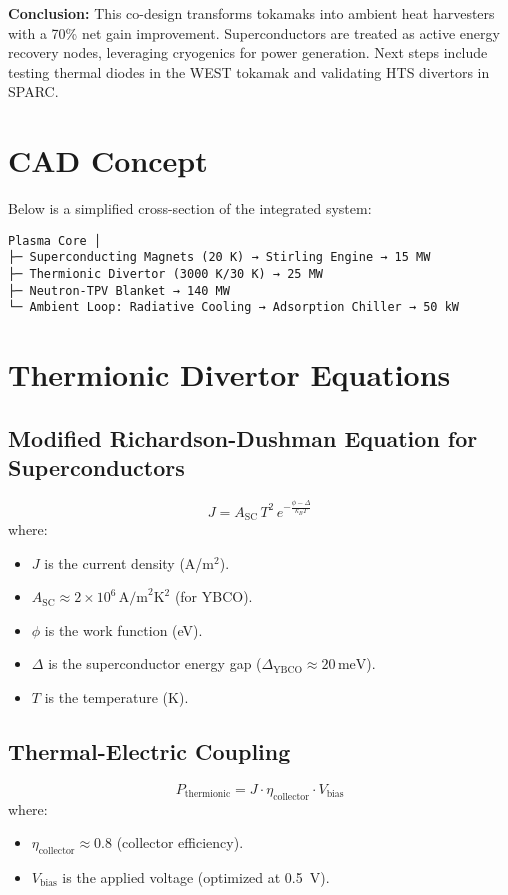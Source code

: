 \documentclass[12pt]{article}
\begin{document}
\noindent \textbf{Conclusion:} This co-design transforms tokamaks into ambient heat harvesters with a 70\% net gain improvement. Superconductors are treated as active energy recovery nodes, leveraging cryogenics for power generation. Next steps include testing thermal diodes in the WEST tokamak and validating HTS divertors in SPARC.

\section{CAD Concept}
Below is a simplified cross-section of the integrated system:
\begin{verbatim}
Plasma Core │
├─ Superconducting Magnets (20 K) → Stirling Engine → 15 MW
├─ Thermionic Divertor (3000 K/30 K) → 25 MW
├─ Neutron-TPV Blanket → 140 MW
└─ Ambient Loop: Radiative Cooling → Adsorption Chiller → 50 kW
\end{verbatim}

\section{Thermionic Divertor Equations}
\subsection{Modified Richardson-Dushman Equation for Superconductors}
\begin{equation}
    J = A_{\text{SC}}\,T^2\,e^{-\frac{\phi - \Delta}{k_B T}}
\end{equation}
where:
\begin{itemize}
    \item $J$ is the current density (A/m$^2$).
    \item $A_{\text{SC}} \approx 2\times10^6\,\text{A/m}^2\text{K}^2$ (for YBCO).
    \item $\phi$ is the work function (eV).
    \item $\Delta$ is the superconductor energy gap ($\Delta_{\text{YBCO}} \approx 20\,\text{meV}$).
    \item $T$ is the temperature (K).
\end{itemize}

\subsection{Thermal-Electric Coupling}
\begin{equation}
    P_{\text{thermionic}} = J \cdot \eta_{\text{collector}} \cdot V_{\text{bias}}
\end{equation}
where:
\begin{itemize}
    \item $\eta_{\text{collector}} \approx 0.8$ (collector efficiency).
    \item $V_{\text{bias}}$ is the applied voltage (optimized at 0.5~V).
\end{itemize}
\end{document}

